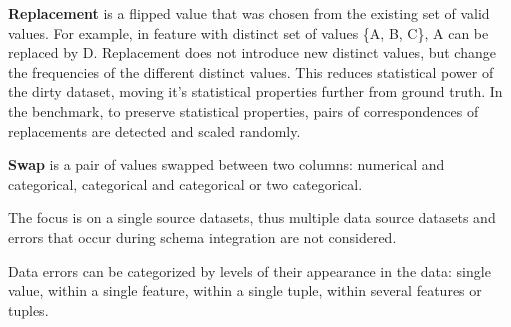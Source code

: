 \textbf{Replacement} is a flipped value that was chosen from the existing set of valid values. 
For example, in feature with distinct set of values \textsc{\{A, B, C\}}, \textsc{A} can be replaced by \textsc{D}. 
Replacement does not introduce new distinct values, but change the frequencies of the different distinct values. 
This reduces statistical power of the dirty dataset, moving it's statistical properties further from ground truth.
In the benchmark, to preserve statistical properties, pairs of correspondences of replacements are detected and scaled randomly. 

\textbf{Swap} is a pair of values swapped between two columns: numerical and categorical, categorical and categorical or two categorical.




The focus is on a single source datasets, thus multiple data source datasets and errors that occur during schema integration are not considered.


Data errors can be categorized by levels of their appearance in the data: single value, within a single feature, within a single tuple, within several features or tuples.





